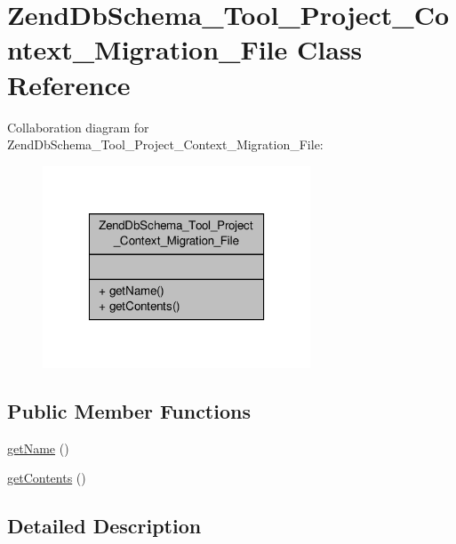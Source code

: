 \hypertarget{classZendDbSchema__Tool__Project__Context__Migration__File}{\section{Zend\-Db\-Schema\-\_\-\-Tool\-\_\-\-Project\-\_\-\-Context\-\_\-\-Migration\-\_\-\-File Class Reference}
\label{classZendDbSchema__Tool__Project__Context__Migration__File}
}


Collaboration diagram for Zend\-Db\-Schema\-\_\-\-Tool\-\_\-\-Project\-\_\-\-Context\-\_\-\-Migration\-\_\-\-File\-:\nopagebreak
\begin{figure}[H]
\begin{center}
\leavevmode
\includegraphics[width=226pt]{classZendDbSchema__Tool__Project__Context__Migration__File__coll__graph}
\end{center}
\end{figure}
\subsection*{Public Member Functions}
\begin{DoxyCompactItemize}
\item 
\hyperlink{classZendDbSchema__Tool__Project__Context__Migration__File_ac1d388b7231c122b2f0cc65f7e2bb4e1}{get\-Name} ()
\item 
\hyperlink{classZendDbSchema__Tool__Project__Context__Migration__File_a28e346990ae4a5381ed7246e66af48e5}{get\-Contents} ()
\end{DoxyCompactItemize}


\subsection{Detailed Description}


